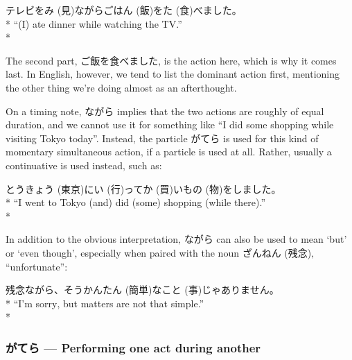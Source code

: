 \documentclass[11pt, b5paper, twoside, openright, onecolumn]{book}
\makeatletter
\newcommand*{\rubystack}[2]{{\relscale{0.5}%
  \begin{tabular}[b]{@{}c@{}}%
    {#1}\\%
   {\textscale{2}{#2}}%
  \end{tabular}}%
}
\DeclareRobustCommand*{\ruby}[2]{%
  \mbox{%
    \setlength{\parskip}{0ex}%
    \BeginAccSupp{method=pdfstringdef,ActualText={#1}}%
      \rubystack{\phantom{#2}}{#1}%
      \llap{%
        \rubystack{#2}{\phantom{#1}}%
      }%
    \EndAccSupp{}%
  }%
}
\renewcommand*{\ruby}[2]{#2 (#1)}%
\newenvironment{exampleblock}{
\setlength{\parindent}{0.6in}
\begin{minipage}[t]{\dimexpr\textwidth-\parindent}}
{\end{minipage}}
\makeatother
\begin{document}
\vspace{0.4cm}
\begin{exampleblock}
テレビを\ruby{見}{み}ながらご\ruby{飯}{はん}を\ruby{食}{た}べました。 \\* 
“(I) ate dinner while watching the TV.” \\* 
\end{exampleblock}
\vspace{0.2cm}

The second part‚ ご飯を食べました‚ is the  action here‚ which is why it comes last. In English‚ however‚ we tend to list the dominant action first‚ mentioning the other thing we’re doing almost as an afterthought.

On a timing note‚ ながら implies that the two actions are roughly of equal duration‚ and we cannot use it for something like “I did some shopping while visiting Tokyo today”. Instead‚ the particle がてら is used for this kind of momentary simultaneous action‚ if a particle is used at all. Rather‚ usually a continuative is used instead‚ such as:

\vspace{0.4cm}
\begin{exampleblock}
\ruby{東京}{とうきょう}に\ruby{行}{い}って\ruby{買}{か}い\ruby{物}{もの}をしました。 \\* 
“I went to Tokyo (and) did (some) shopping (while there).” \\* 
\end{exampleblock}
\vspace{0.2cm}

In addition to the obvious interpretation‚ ながら can also be used to mean ‘but’ or ‘even though’‚ especially when paired with the noun \ruby{残念}{ざんねん}‚ “unfortunate”:

\vspace{0.4cm}
\begin{exampleblock}
残念ながら、そう\ruby{簡単}{かんたん}な\ruby{事}{こと}じゃありません。 \\* 
“I’m sorry‚ but matters are not that simple.” \\* 
\end{exampleblock}
\subsubsection{がてら — Performing one act during another}
\end{document}
